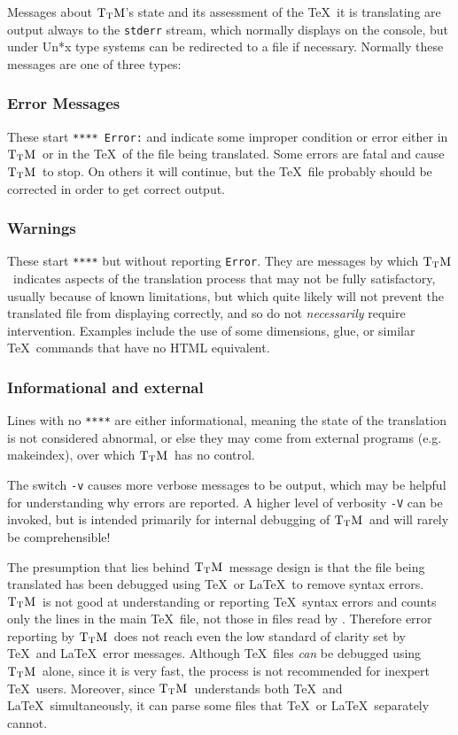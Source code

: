 \documentclass[12pt]{article}
\def\TtM{$\rm{}T_TH$}
\def\TtM{$\rm{}T_TM$}%
\begin{document}
Messages about \TtM's state and its assessment of the \TeX\ it is
translating are output always to the \verb!stderr! stream, which
normally displays on the console, but under Un*x type systems can be
redirected to a file if necessary. Normally these messages are one of
three types:

\subsubsection*{Error Messages} 
These start \verb!**** Error:! and indicate some improper condition or
error either in \TtM\ or in the \TeX\ of the file being
translated. Some errors are fatal and cause \TtM\ to stop. On others
it will continue, but the \TeX\ file probably should be corrected in
order to get correct output.

\subsubsection*{Warnings}
These start \verb!****! but without reporting \verb!Error!. They are
messages by which \TtM\ indicates aspects of the translation process
that may not be fully satisfactory, usually because of known limitations,
but which quite likely will not prevent the translated file from
displaying correctly, and so do not {\em necessarily} require
intervention. Examples include the use of some dimensions, glue, or similar
\TeX\ commands that have no HTML equivalent. 

\subsubsection*{Informational and external}
Lines with no \verb!****! are either informational, meaning the state
of the translation is not considered abnormal, or else they may come
from external programs (e.g. makeindex), over which \TtM\ has no
control.

The switch \verb!-v! causes more verbose messages to be output, which
may be helpful for understanding why errors are reported. A higher
level of verbosity \verb!-V! can be invoked, but is intended primarily
for internal debugging of \TtM\ and will rarely be comprehensible!

The presumption that lies behind \TtM\ message design is that the file
being translated has been debugged using \TeX\ or \LaTeX\ to remove
syntax errors. \TtM\ is not good at understanding or reporting \TeX\
syntax errors and counts only the lines in the main \TeX\ file, not
those in files read by \verb!!. Therefore error reporting by
\TtM\ does not reach even the low standard of clarity set by \TeX\ and
\LaTeX\ error messages. Although \TeX\ files {\em can} be debugged using
\TtM\ alone, since it is very fast, the process is not recommended for
inexpert \TeX\ users. Moreover, since \TtM\ understands both \TeX\ and
\LaTeX\ simultaneously, it can parse some files that \TeX\ or \LaTeX\ 
separately cannot.
\end{document}

